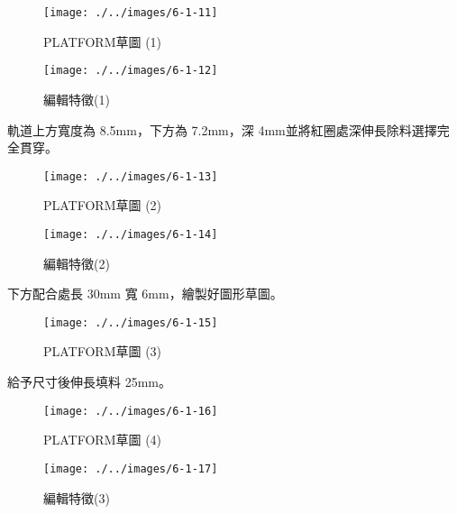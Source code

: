 \begin{figure}[h!]
    \centering
    \begin{minipage}[b]{0.6\textwidth}
        \centering
        \texttt{[image: ./../images/6-1-11]}
        \caption{PLATFORM草圖 (1)}
    \end{minipage}
    \hfill
    \begin{minipage}[b]{0.35\textwidth}
        \centering
        \texttt{[image: ./../images/6-1-12]} 
        \caption{編輯特徵(1)}
    \end{minipage}
\end{figure}
    
軌道上方寬度為 8.5mm，下方為 7.2mm，深 4mm並將紅圈處深伸長除料選擇完全貫穿。

\begin{figure}[h!]
    \centering
    \begin{minipage}[b]{0.6\textwidth}
        \centering
        \texttt{[image: ./../images/6-1-13]}
        \caption{PLATFORM草圖 (2)}
    \end{minipage}
    \hfill
    \begin{minipage}[b]{0.35\textwidth}
        \centering
        \texttt{[image: ./../images/6-1-14]} 
        \caption{編輯特徵(2)}
    \end{minipage}
\end{figure}

\newpage

下方配合處長 30mm 寬 6mm，繪製好圖形草圖。

\begin{figure}[htbp]
    \centering
    \texttt{[image: ./../images/6-1-15]}
    \caption{PLATFORM草圖 (3)}
\end{figure}

給予尺寸後伸長填料 25mm。
\begin{figure}[h!]
    \centering
    \begin{minipage}[b]{0.6\textwidth}
        \centering
        \texttt{[image: ./../images/6-1-16]}
        \caption{PLATFORM草圖 (4)}
    \end{minipage}
    \hfill
    \begin{minipage}[b]{0.35\textwidth}
        \centering
        \texttt{[image: ./../images/6-1-17]} 
        \caption{編輯特徵(3)}
    \end{minipage}
\end{figure}

